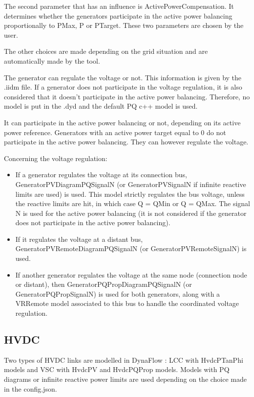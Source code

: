 \documentclass[a4paper, 12pt]{report}
\begin{document}
\par The second parameter that has an influence is ActivePowerCompensation. It determines whether the generators participate in the active power balancing proportionally to PMax, P or PTarget. These two parameters are chosen by the user.

\par The other choices are made depending on the grid situation and are automatically made by the tool.

\par The generator can regulate the voltage or not. This information is given by the .iidm file. If a generator does not participate in the voltage regulation, it is also considered that it doesn't participate in the active power balancing. Therefore, no model is put in the .dyd and the default PQ c++ model is used.

\par It can participate in the active power balancing or not, depending on its active power reference. Generators with an active power target equal to 0 do not participate in the active power balancing. They can however regulate the voltage.

\par Concerning the voltage regulation:

\begin{itemize}
\item If a generator regulates the voltage at its connection bus, GeneratorPVDiagramPQSignalN (or GeneratorPVSignalN if infinite reactive limits are used) is used. This model strictly regulates the bus voltage, unless the reactive limits are hit, in which case Q = QMin or Q = QMax. The signal N is used for the active power balancing (it is not considered if the generator does not participate in the active power balancing).
\item If it regulates the voltage at a distant bus, GeneratorPVRemoteDiagramPQSignalN (or GeneratorPVRemoteSignalN) is used.
\item If another generator regulates the voltage at the same node (connection node or distant), then GeneratorPQPropDiagramPQSignalN (or GeneratorPQPropSignalN) is used for both generators, along with a VRRemote model associated to this bus to handle the coordinated voltage regulation.
\end{itemize}

\subsection{HVDC}
\par Two types of HVDC links are modelled in DynaFlow : LCC with HvdcPTanPhi models and VSC with HvdcPV and HvdcPQProp models. Models with PQ diagrams or infinite reactive power limits are used depending on the choice made in the config.json.
\end{document}

